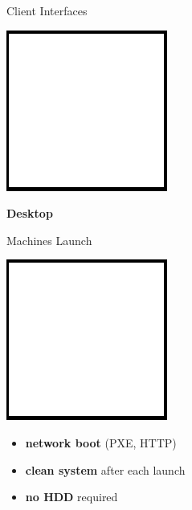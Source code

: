 \documentclass[12pt]{beamer}
\begin{document}
\begin{frame}{Client Interfaces}
	\begin{center}
		\includegraphics[keepaspectratio=true,height=0.5\textheight]{images/image.png}
	\end{center}
\end{frame}


\begin{frame}
	\begin{center}
		\LARGE\textbf{Desktop}	
	\end{center}
\end{frame}

\begin{frame}{Machines Launch}
	\begin{center}
		\includegraphics[keepaspectratio=true,height=0.5\textheight]{images/image.png}
	\end{center}
	\begin{itemize}
		\item \textbf{network boot} (PXE, HTTP)
		\item \textbf{clean system} after each launch
		\item \textbf{no HDD} required
	\end{itemize}
\end{frame}
\end{document}
